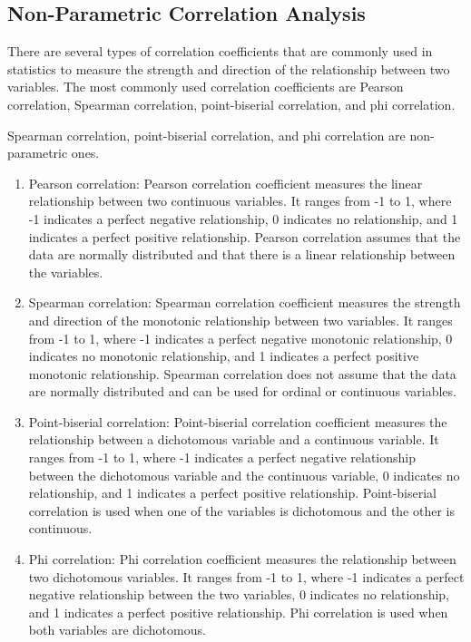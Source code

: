 \documentclass[
]{ctexart}
\begin{document}
\hypertarget{non-parametric-correlation-analysis}{%
\subsection{Non-Parametric Correlation
Analysis}\label{non-parametric-correlation-analysis}}

There are several types of correlation coefficients that are commonly
used in statistics to measure the strength and direction of the
relationship between two variables. The most commonly used correlation
coefficients are Pearson correlation, Spearman correlation,
point-biserial correlation, and phi correlation.

Spearman correlation, point-biserial correlation, and phi correlation
are non-parametric ones.

\begin{enumerate}
\def\labelenumi{\arabic{enumi}.}
\item
  Pearson correlation: Pearson correlation coefficient measures the
  linear relationship between two continuous variables. It ranges from
  -1 to 1, where -1 indicates a perfect negative relationship, 0
  indicates no relationship, and 1 indicates a perfect positive
  relationship. Pearson correlation assumes that the data are normally
  distributed and that there is a linear relationship between the
  variables.
\item
  Spearman correlation: Spearman correlation coefficient measures the
  strength and direction of the monotonic relationship between two
  variables. It ranges from -1 to 1, where -1 indicates a perfect
  negative monotonic relationship, 0 indicates no monotonic
  relationship, and 1 indicates a perfect positive monotonic
  relationship. Spearman correlation does not assume that the data are
  normally distributed and can be used for ordinal or continuous
  variables.
\item
  Point-biserial correlation: Point-biserial correlation coefficient
  measures the relationship between a dichotomous variable and a
  continuous variable. It ranges from -1 to 1, where -1 indicates a
  perfect negative relationship between the dichotomous variable and the
  continuous variable, 0 indicates no relationship, and 1 indicates a
  perfect positive relationship. Point-biserial correlation is used when
  one of the variables is dichotomous and the other is continuous.
\item
  Phi correlation: Phi correlation coefficient measures the relationship
  between two dichotomous variables. It ranges from -1 to 1, where -1
  indicates a perfect negative relationship between the two variables, 0
  indicates no relationship, and 1 indicates a perfect positive
  relationship. Phi correlation is used when both variables are
  dichotomous.
\end{enumerate}
\end{document}
